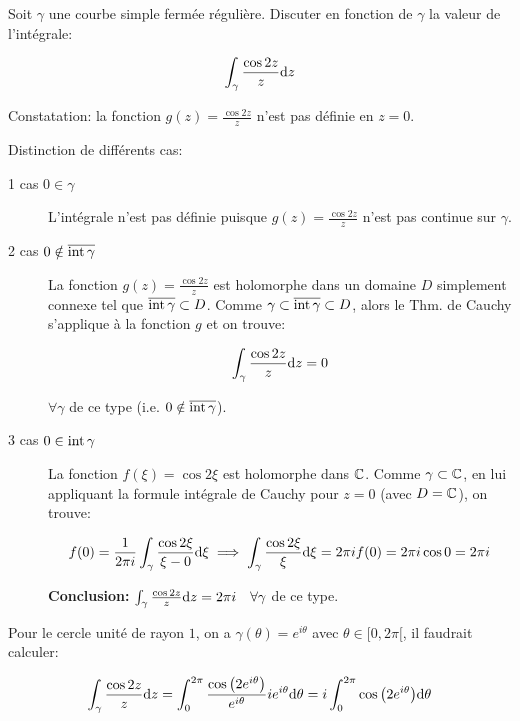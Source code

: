 \begin{example}[1]
    Soit $\gamma$ une courbe simple fermée régulière.
    Discuter en fonction de $\gamma$ la valeur de l'intégrale:
    
    \[\int_\gamma \frac{\cos 2z}{z} \mathrm{d}z\]
    
    Constatation: la fonction $g(z) = \frac{\cos 2z}{z}$ n'est pas définie en $z = 0$.
    
    Distinction de différents cas:
    
    \begin{description}
    \item[1\ier{} cas $0 \in \gamma$]
    L'intégrale n'est pas définie puisque $g(z) = \frac{\cos 2z}{z}$ n'est pas continue sur $\gamma$.
    
    \item[2\ieme{} cas $0 \notin \overline{\textrm{int}\, \gamma}$]
    La fonction $g(z) = \frac{\cos 2z}{z}$ est holomorphe dans un domaine $D$ simplement connexe tel que $\overline{\textrm{int}\, \gamma} \subset D$.
    Comme $\gamma \subset \overline{\textrm{int}\, \gamma} \subset D$, alors le Thm. de Cauchy s'applique à la fonction $g$ et on trouve:
    
    \[\int_\gamma \frac{\cos 2z}{z} \mathrm{d}z = 0\]
    
    $\forall \gamma$ de ce type (i.e. $0 \notin \overline{\textrm{int}\, \gamma}$).
    
    \item[3\ieme{} cas $0 \in \textrm{int}\,{\gamma}$]
    La fonction $f(\xi) = \cos 2\xi$ est holomorphe dans $\mathbb{C}$.
    Comme $\gamma \subset \mathbb{C}$, en lui appliquant la formule intégrale de Cauchy pour $z = 0$ (avec $D = \mathbb{C}$), on trouve:
    
    \[
    f(0) = \frac{1}{2 \pi i} \int_\gamma \frac{\cos 2\xi}{\xi - 0} \mathrm{d}\xi
    \implies \int_\gamma \frac{\cos 2\xi}{\xi} \mathrm{d}\xi = 2\pi i f(0) = 2\pi i \cos 0 = 2\pi i
    \]
    
    \textbf{Conclusion:} $\int_\gamma \frac{\cos 2z}{z} \mathrm{d}z = 2\pi i \quad \forall \gamma$ de ce type.
    \end{description}
\end{example}

\begin{remark}
    Pour le cercle unité de rayon $1$, on a $\gamma(\theta) = e^{i\theta}$ avec $\theta \in [0,2\pi[$, il faudrait calculer:
    
    \[
    \int_\gamma \frac{\cos 2z}{z} \mathrm{d}z
    = \int_0^{2\pi} \frac{\cos \big(2e^{i\theta}\big)}{e^{i\theta}} i e^{i\theta} \mathrm{d}\theta
    = i \int_0^{2\pi} \cos \big(2e^{i\theta}\big) \mathrm{d}\theta
    \]
\end{remark}

